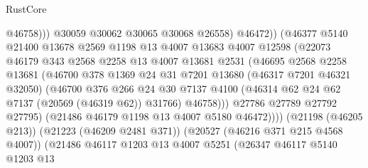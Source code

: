 \begin{lexlean}{RustCore}
\begin{coremodule}
                                      @46758)))
                                @30059
                                @30062
                                @30065
                                @30068
                                @26558)
                              @46472))
                          (@46377
                            @5140
                            @21400
                            @13678
                            @2569
                            @1198
                            @13
                            @4007
                            @13683
                            @4007
                            @12598
                            (@22073
                              @46179
                              @343
                              @2568
                              @2258
                              @13
                              @4007
                              @13681
                              @2531
                              (@46695
                                @2568
                                @2258
                                @13681
                                (@46700
                                  @378
                                  @1369
                                  @24
                                  @31
                                  @7201
                                  @13680
                                  (@46317 @7201 @46321 @32050)
                                  (@46700
                                    @376
                                    @266
                                    @24
                                    @30
                                    @7137
                                    @4100
                                    (@46314 @62 @24 @62 @7137 (@20569 (@46319 @62)) @31766)
                                    @46758)))
                              @27786
                              @27789
                              @27792
                              @27795)
                            (@21486 @46179 @1198 @13 @4007 @5180 @46472))))
                      (@21198 (@46205 @213))
                      (@21223 (@46209 @2481 @371))
                      (@20527 (@46216 @371 @215 @4568 @4007))
                      (@21486
                        @46117
                        @1203
                        @13
                        @4007
                        @5251
                        (@26347
                          @46117
                          @5140
                          @1203
                          @13

\end{coremodule}
\end{lexlean}
